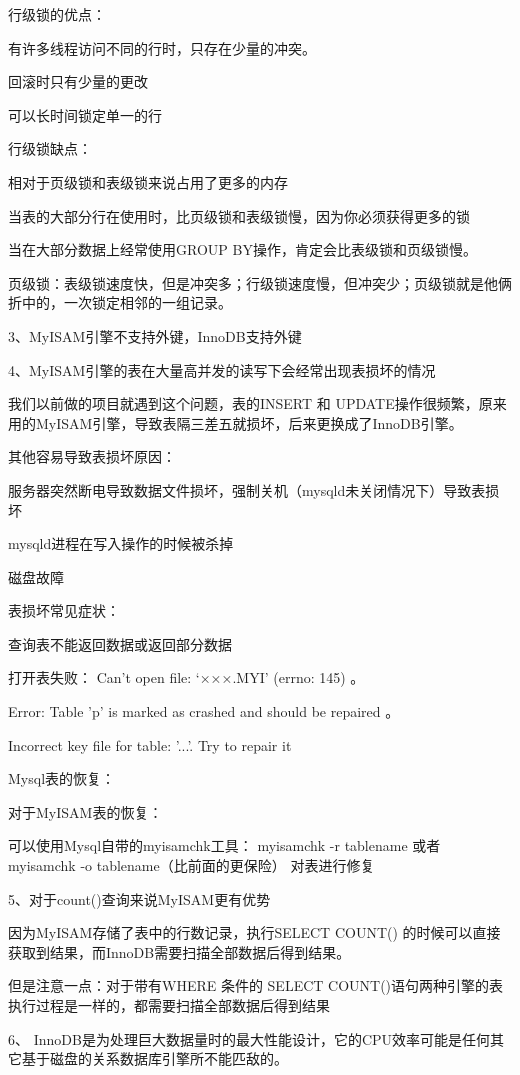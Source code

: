 \documentclass[UTF8]{ctexart}
\begin{document}
行级锁的优点：
 
有许多线程访问不同的行时，只存在少量的冲突。
 
回滚时只有少量的更改
 
可以长时间锁定单一的行
 
行级锁缺点：
 
相对于页级锁和表级锁来说占用了更多的内存
 
当表的大部分行在使用时，比页级锁和表级锁慢，因为你必须获得更多的锁
 
当在大部分数据上经常使用GROUP BY操作，肯定会比表级锁和页级锁慢。
 
页级锁：表级锁速度快，但是冲突多；行级锁速度慢，但冲突少；页级锁就是他俩折中的，一次锁定相邻的一组记录。

3、MyISAM引擎不支持外键，InnoDB支持外键

4、MyISAM引擎的表在大量高并发的读写下会经常出现表损坏的情况
 
我们以前做的项目就遇到这个问题，表的INSERT 和 UPDATE操作很频繁，原来用的MyISAM引擎，导致表隔三差五就损坏，后来更换成了InnoDB引擎。
 
其他容易导致表损坏原因：
 
服务器突然断电导致数据文件损坏，强制关机（mysqld未关闭情况下）导致表损坏
 
mysqld进程在写入操作的时候被杀掉
 
磁盘故障
 
表损坏常见症状：
 
查询表不能返回数据或返回部分数据
 
打开表失败： Can’t open file: ‘×××.MYI’ (errno: 145) 。
 
Error: Table 'p' is marked as crashed and should be repaired 。

Incorrect key file for table: '...'. Try to repair it
 
Mysql表的恢复：

对于MyISAM表的恢复：

可以使用Mysql自带的myisamchk工具： myisamchk -r tablename  或者 myisamchk -o tablename（比前面的更保险） 对表进行修复

5、对于count()查询来说MyISAM更有优势

因为MyISAM存储了表中的行数记录，执行SELECT COUNT() 的时候可以直接获取到结果，而InnoDB需要扫描全部数据后得到结果。

但是注意一点：对于带有WHERE 条件的 SELECT COUNT()语句两种引擎的表执行过程是一样的，都需要扫描全部数据后得到结果

6、 InnoDB是为处理巨大数据量时的最大性能设计，它的CPU效率可能是任何其它基于磁盘的关系数据库引擎所不能匹敌的。
\end{document}
